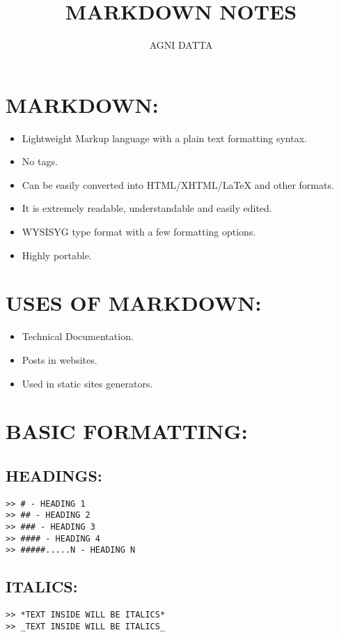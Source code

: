 \documentclass[11pt,british]{article}
\begin{document}
\title{\textbf{MARKDOWN NOTES}}
\author{AGNI DATTA}

\maketitle
{\small{}\tableofcontents{}}{\small\par}

\pagebreak{}

\section{MARKDOWN:}
\begin{itemize}
\item Lightweight Markup language with a plain text formatting syntax.
\item No tags.
\item Can be easily converted into HTML/XHTML/\LaTeX\: and other formats.
\item It is extremely readable, understandable and easily edited.
\item WYSISYG type format with a few formatting options.
\item Highly portable.
\end{itemize}

\section{USES OF MARKDOWN:}
\begin{itemize}
\item Technical Documentation.
\item Posts in websites.
\item Used in static sites generators.
\end{itemize}

\section{BASIC FORMATTING:}

\subsection{HEADINGS:}
\begin{verbatim}
>> # - HEADING 1
>> ## - HEADING 2
>> ### - HEADING 3
>> #### - HEADING 4
>> #####.....N - HEADING N
\end{verbatim}

\subsection{ITALICS:}
\begin{verbatim}
>> *TEXT INSIDE WILL BE ITALICS*
>> _TEXT INSIDE WILL BE ITALICS_
\end{verbatim}
\end{document}
